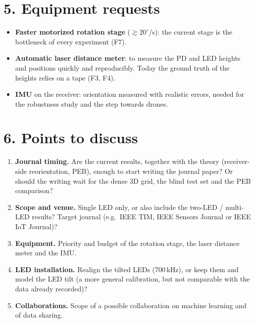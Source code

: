 \documentclass[10.5pt,a4paper]{article}
\begin{document}
\section*{5. Equipment requests}
\begin{itemize}
\item \textbf{Faster motorized rotation stage} ($\gtrsim 20^\circ$/s): the current stage is the
  bottleneck of every experiment (F7).
\item \textbf{Automatic laser distance meter}: to measure the PD and LED heights and positions quickly
  and reproducibly. Today the ground truth of the heights relies on a tape (F3, F4).
\item \textbf{IMU} on the receiver: orientation measured with realistic errors, needed for the
  robustness study and the step towards drones.
\end{itemize}

\section*{6. Points to discuss}
\begin{enumerate}[leftmargin=6mm]
\item \textbf{Journal timing.} Are the current results, together with the theory (receiver-side
  reorientation, PEB), enough to start writing the journal paper? Or should the writing wait for the
  dense 3D grid, the blind test set and the PEB comparison?
\item \textbf{Scope and venue.} Single LED only, or also include the two-LED / multi-LED results?
  Target journal (e.g.\ IEEE TIM, IEEE Sensors Journal or IEEE IoT Journal)?
\item \textbf{Equipment.} Priority and budget of the rotation stage, the laser distance meter and the
  IMU.
\item \textbf{LED installation.} Realign the tilted LEDs (700\,kHz), or keep them and model the LED tilt
  (a more general calibration, but not comparable with the data already recorded)?
\item \textbf{Collaborations.} Scope of a possible collaboration on machine learning and of data
  sharing.
\end{enumerate}
\end{document}
